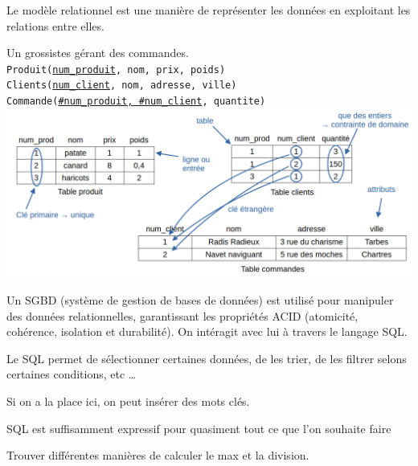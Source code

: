 \begin{definition}
	Le modèle relationnel est une manière de représenter les données en exploitant les relations entre elles.
\end{definition}

\begin{example}
	Un grossistes gérant des commandes.
	\normalfont\\
	\texttt{Produit(\underline{num\_produit}, nom, prix, poids)}\\
	\texttt{Clients(\underline{num\_client}, nom, adresse, ville)}\\
	\texttt{Commande(\underline{\#num\_produit, \#num\_client}, quantite)}\\
	\includegraphics[width=\linewidth]{lecon/21-fichier/schema_bd.png}
\end{example}

\begin{definition}
	Un SGBD (système de gestion de bases de données) est utilisé pour manipuler des données relationnelles, garantissant les propriétés ACID (atomicité, cohérence, isolation et durabilité). On intéragit avec lui à travers le langage SQL.
\end{definition}

\begin{example}
	Le SQL permet de sélectionner certaines données, de les trier, de les filtrer selons certaines conditions, etc \dots
\end{example}

\begin{com}
	Si on a la place ici, on peut insérer des mots clés.
\end{com}

\begin{theorem}[Codd]
	SQL est suffisamment expressif pour quasiment tout ce que l'on souhaite faire
\end{theorem}

\begin{exercise}
	Trouver différentes manières de calculer le max et la division.
\end{exercise}

